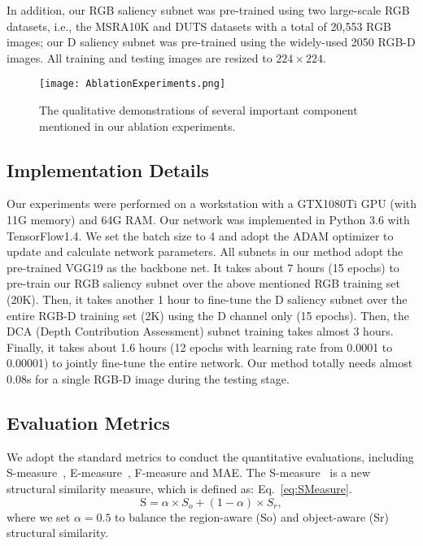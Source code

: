 \documentclass[journal]{IEEEtran}
\begin{document}
In addition, our RGB saliency subnet was pre-trained using two large-scale RGB datasets, i.e., the MSRA10K and DUTS datasets with a total of 20,553 RGB images; our D saliency subnet was pre-trained using the widely-used 2050 RGB-D images.
All training and testing images are resized to $224\times 224$.

\begin{figure*}[t]
\centering
\texttt{[image: AblationExperiments.png]}
\caption{The qualitative demonstrations of several important component mentioned in our ablation experiments.}
\label{fig:Ablation Experiments}
\end{figure*}

\subsection{Implementation Details}
Our experiments were performed on a workstation with a GTX1080Ti GPU (with 11G memory) and 64G RAM. Our network was implemented in Python 3.6 with TensorFlow1.4.
We set the batch size to 4 and adopt the ADAM optimizer to update and calculate network parameters.
All subnets in our method adopt the pre-trained VGG19 as the backbone net.
It takes about 7 hours (15 epochs) to pre-train our RGB saliency subnet over the above mentioned RGB training set (20K).
Then, it takes another 1 hour to fine-tune the D saliency subnet over the entire RGB-D training set (2K) using the D channel only (15 epochs).
Then, the DCA (Depth Contribution Assessment) subnet training takes almost 3 hours.
Finally, it takes about 1.6 hours (12 epochs with learning rate from 0.0001 to 0.00001) to jointly fine-tune the entire network.
Our method totally needs almost 0.08s for a single RGB-D image during the testing stage.




\subsection{Evaluation Metrics}
We adopt the standard metrics to conduct the quantitative evaluations, including S-measure~\cite{fan2017structure}, E-measure~\cite{Fan2018Enhanced}, F-measure and MAE.
The S-measure~\cite{fan2017structure} is a new structural similarity measure, which is defined as:
Eq.~\ref{eq:SMeasure}.
\begin{equation}
\label{eq:SMeasure}
\mathrm{S} =\alpha \times S_{o}+(1-\alpha) \times S_{r},
\end{equation}
where we set $\alpha=0.5$ to balance the region-aware (So) and object-aware (Sr) structural similarity.
\end{document}

